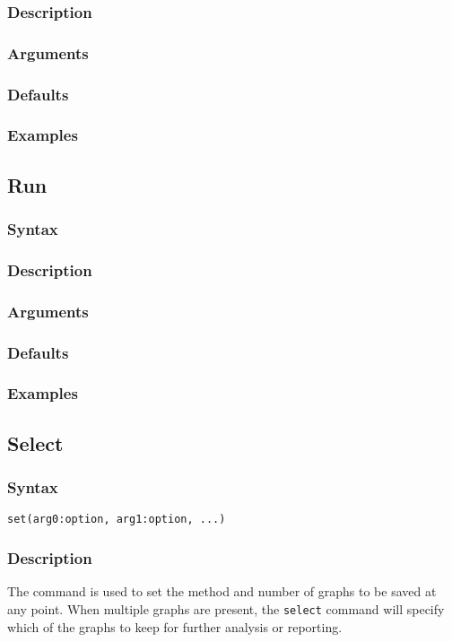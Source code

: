 \documentclass[11pt]{article}
\begin{document}
		\subsubsection{Description}
		\subsubsection{Arguments}
		\subsubsection{Defaults}
		\subsubsection{Examples}
	
	\subsection{Run}
		\subsubsection{Syntax}
		\subsubsection{Description}
		\subsubsection{Arguments}
		\subsubsection{Defaults}
		\subsubsection{Examples}
	
	\subsection{Select}
		\subsubsection{Syntax}
			\texttt{set(arg0:option, arg1:option, ...)}
		\subsubsection{Description}
			The command is used to set the method and number of graphs to be saved at any point.
			When multiple graphs are present, the \texttt{select} command will specify which of the graphs to
			keep for further analysis or reporting.
\end{document}
